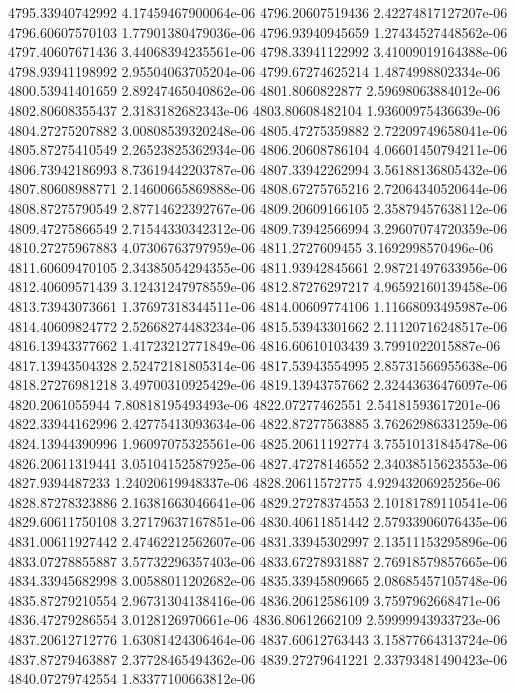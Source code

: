 {4795.33940742992 4.17459467900064e-06
4796.20607519436 2.42274817127207e-06
4796.60607570103 1.77901380479036e-06
4796.93940945659 1.27434527448562e-06
4797.40607671436 3.44068394235561e-06
4798.33941122992 3.41009019164388e-06
4798.93941198992 2.95504063705204e-06
4799.67274625214 1.4874998802334e-06
4800.53941401659 2.89247465040862e-06
4801.8060822877 2.59698063884012e-06
4802.80608355437 2.3183182682343e-06
4803.80608482104 1.93600975436639e-06
4804.27275207882 3.00808539320248e-06
4805.47275359882 2.72209749658041e-06
4805.87275410549 2.26523825362934e-06
4806.20608786104 4.06601450794211e-06
4806.73942186993 8.73619442203787e-06
4807.33942262994 3.56188136805432e-06
4807.80608988771 2.14600665869888e-06
4808.67275765216 2.72064340520644e-06
4808.87275790549 2.87714622392767e-06
4809.20609166105 2.35879457638112e-06
4809.47275866549 2.71544330342312e-06
4809.73942566994 3.29607074720359e-06
4810.27275967883 4.07306763797959e-06
4811.2727609455 3.1692998570496e-06
4811.60609470105 2.34385054294355e-06
4811.93942845661 2.98721497633956e-06
4812.40609571439 3.12431247978559e-06
4812.87276297217 4.96592160139458e-06
4813.73943073661 1.37697318344511e-06
4814.00609774106 1.11668093495987e-06
4814.40609824772 2.52668274483234e-06
4815.53943301662 2.11120716248517e-06
4816.13943377662 1.41723212771849e-06
4816.60610103439 3.7991022015887e-06
4817.13943504328 2.52472181805314e-06
4817.53943554995 2.85731566955638e-06
4818.27276981218 3.49700310925429e-06
4819.13943757662 2.32443636476097e-06
4820.2061055944 7.80818195493493e-06
4822.07277462551 2.54181593617201e-06
4822.33944162996 2.42775413093634e-06
4822.87277563885 3.76262986331259e-06
4824.13944390996 1.96097075325561e-06
4825.20611192774 3.75510131845478e-06
4826.20611319441 3.05104152587925e-06
4827.47278146552 2.34038515623553e-06
4827.9394487233 1.24020619948337e-06
4828.20611572775 4.92943206925256e-06
4828.87278323886 2.16381663046641e-06
4829.27278374553 2.10181789110541e-06
4829.60611750108 3.27179637167851e-06
4830.40611851442 2.57933906076435e-06
4831.00611927442 2.47462212562607e-06
4831.33945302997 2.13511153295896e-06
4833.07278855887 3.57732296357403e-06
4833.67278931887 2.76918579857665e-06
4834.33945682998 3.00588011202682e-06
4835.33945809665 2.08685457105748e-06
4835.87279210554 2.96731304138416e-06
4836.20612586109 3.7597962668471e-06
4836.47279286554 3.0128126970661e-06
4836.80612662109 2.59999943933723e-06
4837.20612712776 1.63081424306464e-06
4837.60612763443 3.15877664313724e-06
4837.87279463887 2.37728465494362e-06
4839.27279641221 2.33793481490423e-06
4840.07279742554 1.83377100663812e-06
}
